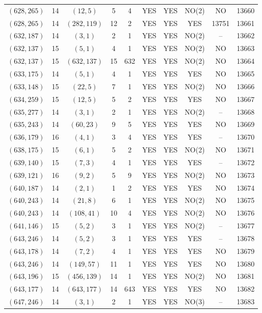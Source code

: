 \begin{longtable}{|c|c|c|c|c|c|c|c|c|c|}
$(628, 265)$ & 14 & $(12, 5)$ & 5 & 4 & YES & YES & NO(2) & NO & 13660\\
$(628, 265)$ & 14 & $(282, 119)$ & 12 & 2 & YES & YES & YES & 13751 & 13661\\
$(632, 187)$ & 14 & $(3, 1)$ & 2 & 1 & YES & YES & NO(2) & -- & 13662\\
$(632, 137)$ & 15 & $(5, 1)$ & 4 & 1 & YES & YES & NO(2) & NO & 13663\\
$(632, 137)$ & 15 & $(632, 137)$ & 15 & 632 & YES & YES & NO(2) & NO & 13664\\
$(633, 175)$ & 14 & $(5, 1)$ & 4 & 1 & YES & YES & YES & NO & 13665\\
$(633, 148)$ & 15 & $(22, 5)$ & 7 & 1 & YES & YES & NO(2) & NO & 13666\\
$(634, 259)$ & 15 & $(12, 5)$ & 5 & 2 & YES & YES & YES & NO & 13667\\
$(635, 277)$ & 14 & $(3, 1)$ & 2 & 1 & YES & YES & NO(2) & -- & 13668\\
$(635, 243)$ & 14 & $(60, 23)$ & 9 & 5 & YES & YES & YES & NO & 13669\\
$(636, 179)$ & 16 & $(4, 1)$ & 3 & 4 & YES & YES & YES & -- & 13670\\
$(638, 175)$ & 15 & $(6, 1)$ & 5 & 2 & YES & YES & NO(2) & NO & 13671\\
$(639, 140)$ & 15 & $(7, 3)$ & 4 & 1 & YES & YES & YES & -- & 13672\\
$(639, 121)$ & 16 & $(9, 2)$ & 5 & 9 & YES & YES & NO(2) & NO & 13673\\
$(640, 187)$ & 14 & $(2, 1)$ & 1 & 2 & YES & YES & YES & NO & 13674\\
$(640, 243)$ & 14 & $(21, 8)$ & 6 & 1 & YES & YES & NO(2) & NO & 13675\\
$(640, 243)$ & 14 & $(108, 41)$ & 10 & 4 & YES & YES & NO(2) & NO & 13676\\
$(641, 146)$ & 15 & $(5, 2)$ & 3 & 1 & YES & YES & NO(2) & -- & 13677\\
$(643, 246)$ & 14 & $(5, 2)$ & 3 & 1 & YES & YES & YES & -- & 13678\\
$(643, 178)$ & 14 & $(7, 2)$ & 4 & 1 & YES & YES & YES & NO & 13679\\
$(643, 246)$ & 14 & $(149, 57)$ & 11 & 1 & YES & YES & YES & NO & 13680\\
$(643, 196)$ & 15 & $(456, 139)$ & 14 & 1 & YES & YES & NO(2) & NO & 13681\\
$(643, 177)$ & 14 & $(643, 177)$ & 14 & 643 & YES & YES & YES & NO & 13682\\
$(647, 246)$ & 14 & $(3, 1)$ & 2 & 1 & YES & YES & NO(3) & -- & 13683\\

\end{longtable}
